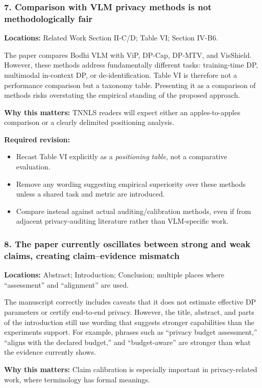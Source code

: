 \subsubsection*{7. Comparison with VLM privacy methods is not methodologically fair}
\textbf{Locations:} Related Work Section II-C/D; Table VI; Section IV-B6.

The paper compares Bodhi VLM with ViP, DP-Cap, DP-MTV, and VisShield. However, these methods address fundamentally different tasks: training-time DP, multimodal in-context DP, or de-identification. Table VI is therefore not a performance comparison but a taxonomy table. Presenting it as a comparison of methods risks overstating the empirical standing of the proposed approach.

\textbf{Why this matters:} TNNLS readers will expect either an apples-to-apples comparison or a clearly delimited positioning analysis.

\textbf{Required revision:}
\begin{itemize}
    \item Recast Table VI explicitly as a \emph{positioning table}, not a comparative evaluation.
    \item Remove any wording suggesting empirical superiority over these methods unless a shared task and metric are introduced.
    \item Compare instead against actual auditing/calibration methods, even if from adjacent privacy-auditing literature rather than VLM-specific work.
\end{itemize}

\subsubsection*{8. The paper currently oscillates between strong and weak claims, creating claim--evidence mismatch}
\textbf{Locations:} Abstract; Introduction; Conclusion; multiple places where ``assessment'' and ``alignment'' are used.

The manuscript correctly includes caveats that it does not estimate effective DP parameters or certify end-to-end privacy. However, the title, abstract, and parts of the introduction still use wording that suggests stronger capabilities than the experiments support. For example, phrases such as ``privacy budget assessment,'' ``aligns with the declared budget,'' and ``budget-aware'' are stronger than what the evidence currently shows.

\textbf{Why this matters:} Claim calibration is especially important in privacy-related work, where terminology has formal meanings.

